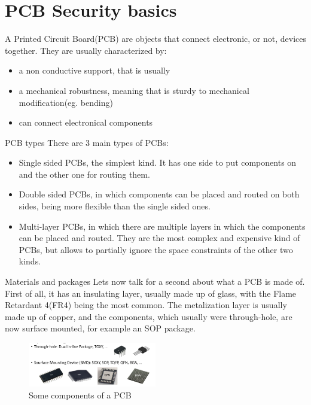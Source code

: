 \chapter{PCB Security basics}
A Printed Circuit Board(PCB) are objects that connect electronic, or not, devices together.
They are usually characterized by:
\begin{itemize}
  \item a non conductive support, that is usually 
  \item a mechanical robustness, meaning that is sturdy to mechanical modification(eg. bending)
  \item can connect electronical components
\end{itemize}
\begin{section}{PCB types}
  There are 3 main types of PCBs:
  \begin{itemize}
    \item Single sided PCBs, the simplest kind. It has one side to put components on and the other
      one for routing them.
    \item Double sided PCBs, in which components can be placed and routed on both sides, being more
      flexible than the single sided ones.
    \item Multi-layer PCBs, in which there are multiple layers in which the components can be placed
      and routed. They are the most complex and expensive kind of PCBs, but allows to partially
      ignore the space constraints of the other two kinds.
  \end{itemize}
\end{section}

\begin{section}{Materials and packages}
  Lets now talk for a second about what a PCB is made of. First of all, it has an insulating layer,
  usually made up of glass, with the Flame Retardant 4(FR4) being the most common. The metalization
  layer is usually made up of copper, and the components, which usually were through-hole, are now
  surface mounted, for example an SOP package.
  \begin{figure}[h]
    \centering
    \includegraphics[width=0.5\textwidth]{img/hardware/pcp components.png}
    \caption{Some components of a PCB}
  \end{figure}
\end{section}
\\

